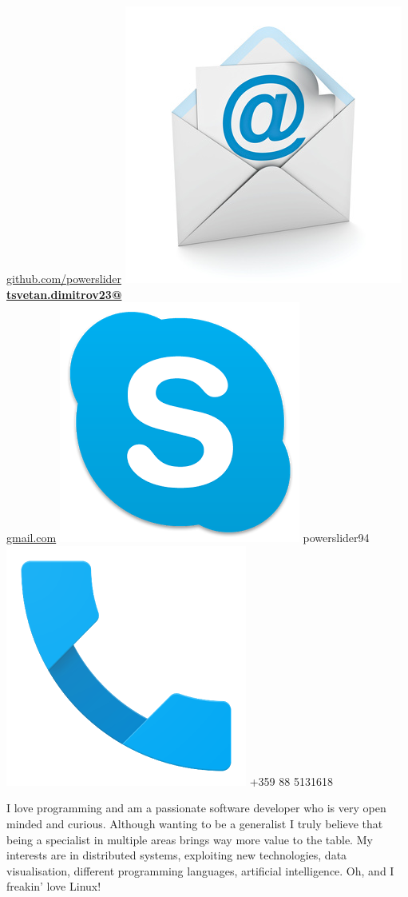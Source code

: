 \documentclass[]{friggeri-cv}
\begin{document}
\begin{aside}
    \href{https://github.com/powerslider}{github.com/powerslider}
    \includegraphics[scale=0.1]{img/email_icon.jpg}
    \href{mailto:tsvetan.dimitrov23@gmail.com}{\textbf{tsvetan.dimitrov23@}\\gmail.com}
    \includegraphics[scale=0.08]{img/skype_logo.png}
    powerslider94
    \includegraphics[scale=0.08]{img/phone_logo.png}
    +359 88 5131618
    ~
    \begin{aboutmebox}
         I love programming and am a passionate software developer who is very open minded and curious. Although wanting to be a generalist I truly believe that being a specialist in multiple areas brings way more value to the table. My interests are in distributed systems, exploiting new technologies, data visualisation, different programming languages, artificial intelligence. Oh, and I freakin' love Linux!
    \end{aboutmebox}
    ~

\end{aside}
\end{document}
